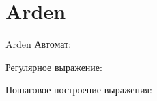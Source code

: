 \section{Arden}
\begin{frame}{Arden}
	Автомат:


	Регулярное выражение:

	Пошаговое построение выражения:


\end{frame}
